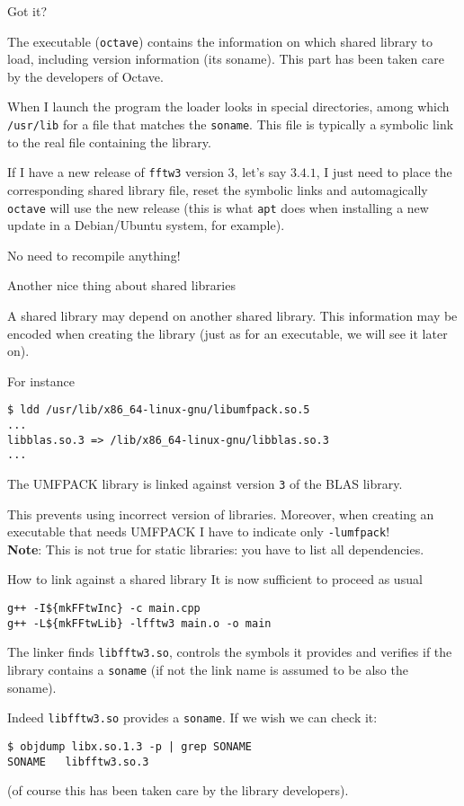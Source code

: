 \documentclass[10pt]{beamer}
\begin{document}
\begin{frame}{Got it?}  

  The executable (\texttt{octave}) contains the
  information on which shared library to load, including version
  information (its soname). This part has been taken care by the 
  developers of Octave.
  \smallskip

  When I launch the program the loader looks in special directories,
  among which \texttt{/usr/lib} for a file that matches the
  \texttt{soname}. This file is typically a symbolic link to the real
  file containing the library.  
  \medskip

  If I have a new release of \texttt{fftw3} version 3, let's say $3.4.1$,
  I just need to place the corresponding shared library file, reset the symbolic links and automagically \texttt{octave}
  will use the new release (this is what \texttt{apt} does when
  installing a new update in a Debian/Ubuntu system, for example).

  \smallskip

  No need to recompile anything!
\end{frame}


\begin{frame}[fragile]{Another nice thing about shared libraries} 

  A shared library may depend on another shared library. This information may be encoded  when creating the library
  (just as for an executable, we will see it later on).

  For instance
\begin{verbatim}
$ ldd /usr/lib/x86_64-linux-gnu/libumfpack.so.5
...
libblas.so.3 => /lib/x86_64-linux-gnu/libblas.so.3
...
\end{verbatim}
The UMFPACK library is linked against version
\texttt{3} of the BLAS library. \smallskip

This prevents using incorrect version of
libraries. Moreover, when creating an executable that needs UMFPACK I have to indicate only
\texttt{-lumfpack}! \\
\textbf{Note}: This is not true for static libraries: you have to list all dependencies.
\end{frame}

\begin{frame}[fragile]{How to link against a shared library}   
  It is now sufficient to proceed as usual
\begin{verbatim}
g++ -I${mkFFtwInc} -c main.cpp
g++ -L${mkFFtwLib} -lfftw3 main.o -o main
\end{verbatim}

The linker finds \texttt{libfftw3.so}, controls the symbols it
provides and verifies if the library contains a
\texttt{soname} (if not the link name is assumed to be also the
soname).

Indeed \texttt{libfftw3.so} provides a \texttt{soname}. If we wish we
can check it:
\begin{verbatim}
$ objdump libx.so.1.3 -p | grep SONAME
SONAME   libfftw3.so.3
\end{verbatim}
(of course this has been taken care by the library developers).
\end{frame}
\end{document}
